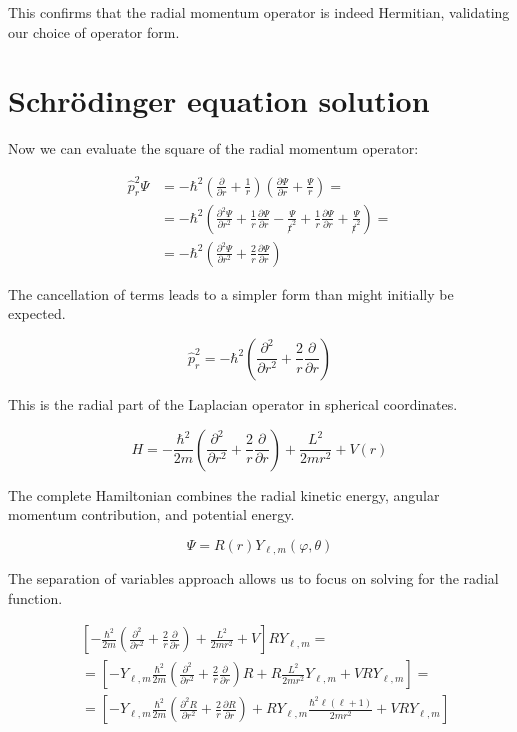 This confirms that the radial momentum operator is indeed Hermitian, validating our choice of operator form.

\section{Schrödinger equation solution}
Now we can evaluate the square of the radial momentum operator:

\begin{align}
\hat{p}_{r}^{2} \Psi & =-\hbar^{2}\left(\frac{\partial}{\partial r}+\frac{1}{r}\right)\left(\frac{\partial \Psi}{\partial r}+\frac{\Psi}{r}\right)= \\
& =-\hbar^{2}\left(\frac{\partial^{2} \Psi}{\partial r^{2}}+\frac{1}{r} \frac{\partial \Psi}{\partial r}-\frac{\Psi}{\not r^{2}}+\frac{1}{r} \frac{\partial \Psi}{\partial r}+\frac{\Psi}{\not r^{2}}\right)=  \\
& =-\hbar^{2}\left(\frac{\partial^{2} \Psi}{\partial r^{2}}+\frac{2}{r} \frac{\partial \Psi}{\partial r}\right)
\end{align}

The cancellation of terms leads to a simpler form than might initially be expected.

\begin{equation}
\hat{p}_{r}^{2}=-\hbar^{2}\left(\frac{\partial^{2}}{\partial r^{2}}+\frac{2}{r} \frac{\partial}{\partial r}\right)
\end{equation}

This is the radial part of the Laplacian operator in spherical coordinates.

\begin{equation}
H=-\frac{\hbar^{2}}{2 m}\left(\frac{\partial^{2}}{\partial r^{2}}+\frac{2}{r} \frac{\partial}{\partial r}\right)+\frac{L^{2}}{2 m r^{2}}+V(r)
\end{equation}

The complete Hamiltonian combines the radial kinetic energy, angular momentum contribution, and potential energy.

\begin{equation}
\Psi=R(r) Y_{\ell, m}(\varphi, \theta)
\end{equation}

The separation of variables approach allows us to focus on solving for the radial function.

\begin{align}
& {\left[-\frac{\hbar^{2}}{2 m}\left(\frac{\partial^{2}}{\partial r^{2}}+\frac{2}{r} \frac{\partial}{\partial r}\right)+\frac{L^{2}}{2 m r^{2}}+V\right] R Y_{\ell, m}=} \\
& =\left[-Y_{\ell, m} \frac{\hbar^{2}}{2 m}\left(\frac{\partial^{2}}{\partial r^{2}}+\frac{2}{r} \frac{\partial}{\partial r}\right) R+R \frac{L^{2}}{2 m r^{2}} Y_{\ell, m}+V R Y_{\ell, m}\right]=  \\
& =\left[-Y_{\ell, m} \frac{\hbar^{2}}{2 m}\left(\frac{\partial^{2} R}{\partial r^{2}}+\frac{2}{r} \frac{\partial R}{\partial r}\right)+R Y_{\ell, m} \frac{\hbar^{2} \ell(\ell+1)}{2 m r^{2}}+V R Y_{\ell, m}\right]
\end{align}

